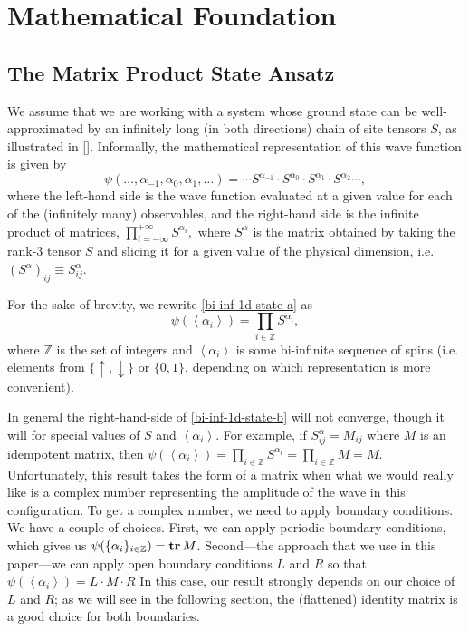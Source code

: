 \documentclass{article}
\newcommand{\seq}[1]{\left<#1\right>}
\newcommand{\tr}{\text{\textbf{tr}}\,}
\newcommand{\Z}{\mathbb{Z}}
\begin{document}
\section{Mathematical Foundation}

\subsection{The Matrix Product State Ansatz}

We assume that we are working with a system whose ground state can be well-approximated by an infinitely long (in both directions) chain of site tensors $S$, as illustrated in [].  Informally, the mathematical representation of this wave function is given by
\begin{equation}
\label{bi-inf-1d-state-a}
\psi(\dots,\alpha_{-1},\alpha_{0},\alpha_1,\dots)= \cdots S^{\alpha_{-1}} \cdot S^{\alpha_0}\cdot S^{\alpha_1}\cdot S^{\alpha_2} \cdots,
\end{equation}
where the left-hand side is the wave function evaluated at a given value for each of the (infinitely many) observables, and the right-hand side is the infinite product of matrices, $\prod_{i=-\infty}^{+\infty} S^{\alpha_i},$ where $S^{\alpha}$ is the matrix obtained by taking the rank-3 tensor $S$ and slicing it for a given value of the physical dimension, i.e. $(S^\alpha)_{ij}\equiv S^\alpha_{ij}$.

For the sake of brevity, we rewrite \eqref{bi-inf-1d-state-a} as
\begin{equation}
\label{bi-inf-1d-state-b}
\psi(\seq{\alpha_i}) = \prod_{i\in\Z} S^{\alpha_i},
\end{equation}
where $\Z$ is the set of integers and $\seq{\alpha_i}$ is some bi-infinite sequence of spins (i.e. elements from $\{\uparrow,\downarrow\}$ or $\{0,1\}$, depending on which representation is more convenient).

In general the right-hand-side of \eqref{bi-inf-1d-state-b} will not converge, though it will for special values of $S$ and $\seq{\alpha_i}$.  For example, if $S^\alpha_{ij}=M_{ij}$ where $M$ is an idempotent matrix, then $\psi(\seq{\alpha_i})=\prod_{i\in\Z} S^{\alpha_i} = \prod_{i\in\Z} M = M$.  Unfortunately, this result takes the form of a matrix when what we would really like is a complex number representing the amplitude of the wave in this configuration.  To get a complex number, we need to apply boundary conditions.  We have a couple of choices.  First, we can apply periodic boundary conditions, which gives us $\psi(\{\alpha_i\}_{i\in\Z})=\tr M$.  Second---the approach that we use in this paper---we can apply open boundary conditions $L$ and $R$ so that $\psi(\seq{\alpha_i})=L\cdot M\cdot R$  In this case, our result strongly depends on our choice of $L$ and $R$; as we will see in the following section, the (flattened) identity matrix is a good choice for both boundaries.
\end{document}
